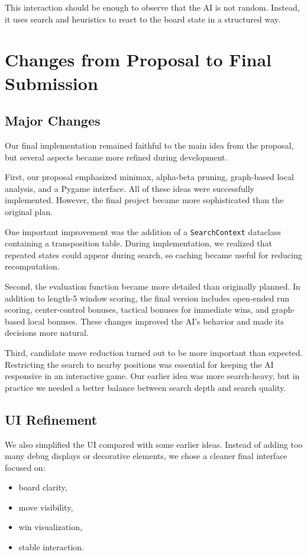\documentclass[11pt]{article}
\begin{document}
This interaction should be enough to observe that the AI is not random. Instead, it uses search and heuristics to react to the board state in a structured way.

\section*{Changes from Proposal to Final Submission}

\subsection*{Major Changes}

Our final implementation remained faithful to the main idea from the proposal, but several aspects became more refined during development.

First, our proposal emphasized minimax, alpha-beta pruning, graph-based local analysis, and a Pygame interface. All of these ideas were successfully implemented. However, the final project became more sophisticated than the original plan.

One important improvement was the addition of a \texttt{SearchContext} dataclass containing a transposition table. During implementation, we realized that repeated states could appear during search, so caching became useful for reducing recomputation.

Second, the evaluation function became more detailed than originally planned. In addition to length-5 window scoring, the final version includes open-ended run scoring, center-control bonuses, tactical bonuses for immediate wins, and graph-based local bonuses. These changes improved the AI's behavior and made its decisions more natural.

Third, candidate move reduction turned out to be more important than expected. Restricting the search to nearby positions was essential for keeping the AI responsive in an interactive game. Our earlier idea was more search-heavy, but in practice we needed a better balance between search depth and search quality.

\subsection*{UI Refinement}

We also simplified the UI compared with some earlier ideas. Instead of adding too many debug displays or decorative elements, we chose a cleaner final interface focused on:
\begin{itemize}
    \item board clarity,
    \item move visibility,
    \item win visualization,
    \item stable interaction.
\end{itemize}
\end{document}
